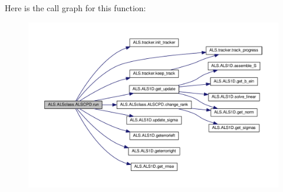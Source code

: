 Here is the call graph for this function\+:
\nopagebreak
\begin{figure}[H]
\begin{center}
\leavevmode
\includegraphics[width=350pt]{class_a_l_s_1_1_a_l_sclass_1_1_a_l_s_c_p_d_abd4b945c9ab6d21530ca62d4960dec8f_cgraph}
\end{center}
\end{figure}


